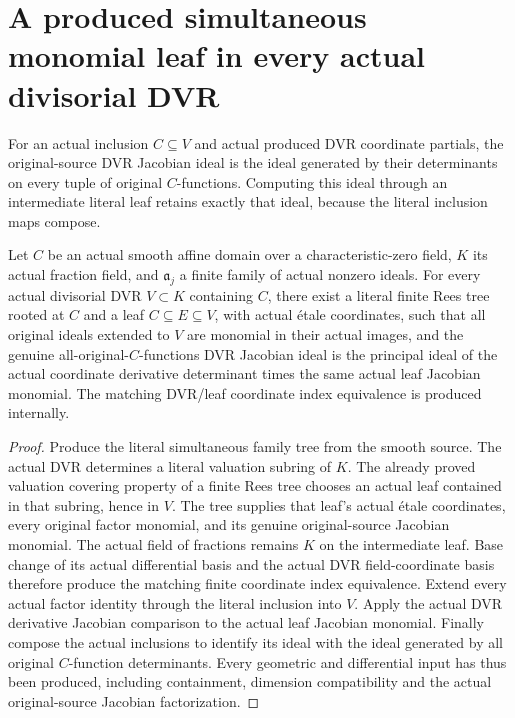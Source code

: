 \section{A produced simultaneous monomial leaf in every actual divisorial DVR}

\begin{definition}\label{def:sc0-original-source-dvr-jacobian-ideal}
\leanok
For an actual inclusion $C\subseteq V$ and actual produced DVR coordinate
partials, the original-source DVR Jacobian ideal is the ideal generated by
their determinants on every tuple of original $C$-functions. Computing this
ideal through an intermediate literal leaf retains exactly that ideal,
because the literal inclusion maps compose.
\end{definition}

\begin{theorem}\label{thm:sc0-smooth-family-dvr-chart}
\leanok
{}
Let $C$ be an actual smooth affine domain over a characteristic-zero field,
$K$ its actual fraction field, and $\mathfrak a_j$ a finite family of actual
nonzero ideals. For every actual divisorial DVR $V\subset K$ containing $C$,
there exist a literal finite Rees tree rooted at $C$ and a leaf
$C\subseteq E\subseteq V$, with actual \'etale coordinates, such that all
original ideals extended to $V$ are monomial in their actual images, and the
genuine all-original-$C$-functions DVR Jacobian ideal is the principal ideal
of the actual coordinate derivative determinant times the same actual leaf
Jacobian monomial. The matching DVR/leaf coordinate index equivalence is
produced internally.
\end{theorem}
\begin{proof}
Produce the literal simultaneous family tree from the smooth source. The
actual DVR determines a literal valuation subring of $K$. The already proved
valuation covering property of a finite Rees tree chooses an actual leaf
contained in that subring, hence in $V$. The tree supplies that leaf's actual
\'etale coordinates, every original factor monomial, and its genuine
original-source Jacobian monomial. The actual field of fractions remains
$K$ on the intermediate leaf. Base change of its actual differential basis
and the actual DVR field-coordinate basis therefore produce the matching
finite coordinate index equivalence. Extend every actual factor identity
through the literal inclusion into $V$. Apply the actual DVR derivative
Jacobian comparison to the actual leaf Jacobian monomial. Finally compose
the actual inclusions to identify its ideal with the ideal generated by all
original $C$-function determinants. Every geometric and differential input
has thus been produced, including containment, dimension compatibility and
the actual original-source Jacobian factorization.
\end{proof}
